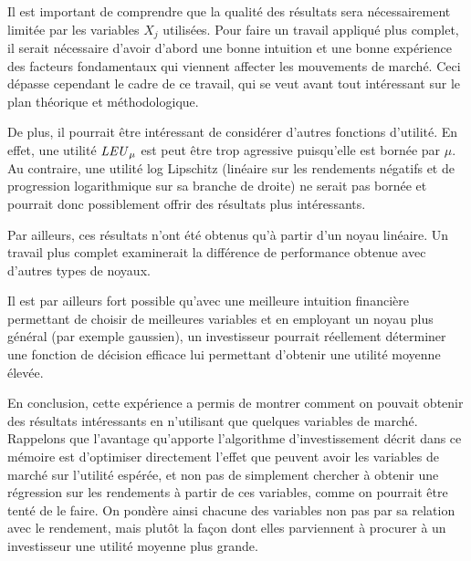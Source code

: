 Il est important de comprendre que la qualité des résultats sera nécessairement limitée
par les variables $X_j$ utilisées. Pour faire un travail appliqué plus complet, il serait
nécessaire d'avoir d'abord une bonne intuition et une bonne expérience des facteurs
fondamentaux qui viennent affecter les mouvements de marché. Ceci dépasse cependant le
cadre de ce travail, qui se veut avant tout intéressant sur le plan théorique et
méthodologique.

De plus, il pourrait être intéressant de considérer d'autres fonctions d'utilité. En
effet, une utilité $\mbox{\textit{LEU}}_\mu$ est peut être trop agressive puisqu'elle est bornée par
$\mu$. Au contraire, une utilité log Lipschitz (linéaire sur les rendements négatifs et de
progression logarithmique sur sa branche de droite) ne serait pas bornée et pourrait donc
possiblement offrir des résultats plus intéressants.

Par ailleurs, ces résultats n'ont été obtenus qu'à partir d'un noyau linéaire. Un travail
plus complet examinerait la différence de performance obtenue avec d'autres types de
noyaux.

Il est par ailleurs fort possible qu'avec une meilleure intuition financière permettant de
choisir de meilleures variables et en employant un noyau plus général (par exemple
gaussien), un investisseur pourrait réellement déterminer une fonction de décision
efficace lui permettant d'obtenir une utilité moyenne élevée.

En conclusion, cette expérience a permis de montrer comment on pouvait obtenir des
résultats intéressants en n'utilisant que quelques variables de marché. Rappelons que
l'avantage qu'apporte l'algorithme d'investissement décrit dans ce mémoire est d'optimiser
directement l'effet que peuvent avoir les variables de marché sur l'utilité espérée, et
non pas de simplement chercher à obtenir une régression sur les rendements à partir de ces
variables, comme on pourrait être tenté de le faire. On pondère ainsi chacune des
variables non pas par sa relation avec le rendement, mais plutôt la façon dont elles
parviennent à procurer à un investisseur une utilité moyenne plus grande.



